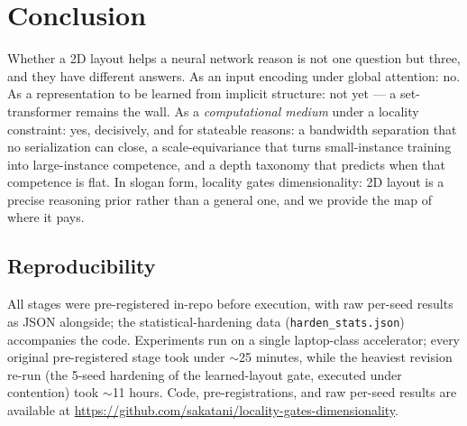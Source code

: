 \documentclass[11pt]{article}
\begin{document}
\section{Conclusion}\label{sec:conclusion}

Whether a 2D layout helps a neural network reason is not one question but
three, and they have different answers. As an input encoding under global
attention: no. As a representation to be learned from implicit structure: not
yet --- a set-transformer remains the wall. As a \emph{computational medium}
under a locality constraint: yes, decisively, and for stateable reasons: a
bandwidth separation that no serialization can close, a scale-equivariance
that turns small-instance training into large-instance competence, and a
depth taxonomy that predicts when that competence is flat. In slogan form,
locality gates dimensionality: 2D layout is a precise reasoning prior rather
than a general one, and we provide the map of where it pays.

\subsection*{Reproducibility}

All stages were pre-registered in-repo before execution, with raw per-seed
results as JSON alongside; the statistical-hardening data
(\texttt{harden\_stats.json}) accompanies the code. Experiments run on a
single laptop-class accelerator; every original pre-registered stage took
under $\sim$25 minutes, while the heaviest revision re-run (the 5-seed
hardening of the learned-layout gate, executed under contention) took
$\sim$11 hours. Code, pre-registrations, and raw per-seed results are
available at
\url{https://github.com/sakatani/locality-gates-dimensionality}.



\end{document}
